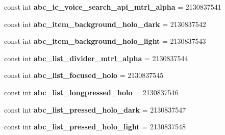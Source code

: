 \begin{DoxyCompactItemize}
const int {\bfseries abc\+\_\+ic\+\_\+voice\+\_\+search\+\_\+api\+\_\+mtrl\+\_\+alpha} = 2130837541
\item 
\mbox{\label{class_sample_app_1_1_droid_1_1_resource_1_1_drawable_a15c0b8dbdbc698c6331ef552fa680ec2}} 
const int {\bfseries abc\+\_\+item\+\_\+background\+\_\+holo\+\_\+dark} = 2130837542
\item 
\mbox{\label{class_sample_app_1_1_droid_1_1_resource_1_1_drawable_a18a326d9eccf43c4242210940c522121}} 
const int {\bfseries abc\+\_\+item\+\_\+background\+\_\+holo\+\_\+light} = 2130837543
\item 
\mbox{\label{class_sample_app_1_1_droid_1_1_resource_1_1_drawable_a86dfcd297a33f160d8f8030fc31a5dd2}} 
const int {\bfseries abc\+\_\+list\+\_\+divider\+\_\+mtrl\+\_\+alpha} = 2130837544
\item 
\mbox{\label{class_sample_app_1_1_droid_1_1_resource_1_1_drawable_ad91358368b6aadfdda42578423f674dc}} 
const int {\bfseries abc\+\_\+list\+\_\+focused\+\_\+holo} = 2130837545
\item 
\mbox{\label{class_sample_app_1_1_droid_1_1_resource_1_1_drawable_a6980b2d6b52a2fd23d6c7607f4bcf1b0}} 
const int {\bfseries abc\+\_\+list\+\_\+longpressed\+\_\+holo} = 2130837546
\item 
\mbox{\label{class_sample_app_1_1_droid_1_1_resource_1_1_drawable_a60ae800942f89b6fe9289a9911fef1ab}} 
const int {\bfseries abc\+\_\+list\+\_\+pressed\+\_\+holo\+\_\+dark} = 2130837547
\item 
\mbox{\label{class_sample_app_1_1_droid_1_1_resource_1_1_drawable_a81b0b8ead49e59e61283e6a311b2c170}} 
const int {\bfseries abc\+\_\+list\+\_\+pressed\+\_\+holo\+\_\+light} = 2130837548
\item 
\mbox{\label{class_sample_app_1_1_droid_1_1_resource_1_1_drawable_a2912e727df36d2e072873b54c8a83acb}} 

\end{DoxyCompactItemize}

